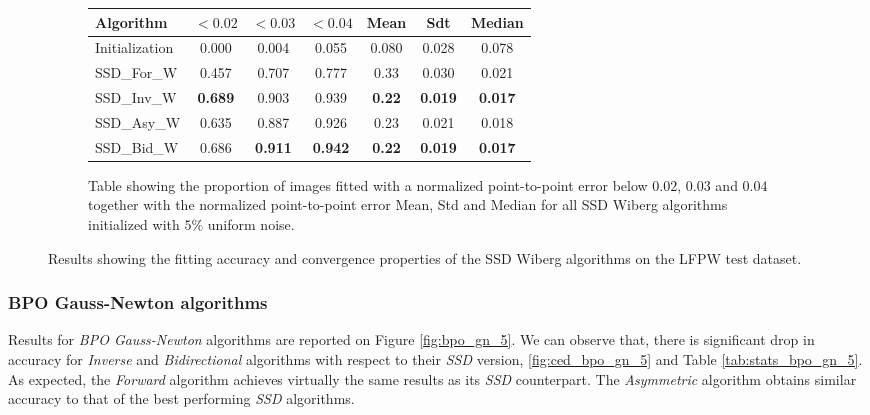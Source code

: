 \begin{figure}[p]
\begin{subfigure}{0.48\textwidth}
	    \label{fig:mean_cost_vs_iters2_ssd_w_5}
	\end{subfigure}
	\par\bigskip\bigskip
	\begin{subfigure}{\textwidth}
		\center
		\begin{tabular}{lcccccc}
		    \toprule
		    Algorithm & $<0.02$ & $<0.03$ & $<0.04$ & Mean & Sdt & Median 
		    \\
		    \midrule
		    Initialization & 0.000 & 0.004 & 0.055 & 0.080 & 0.028 & 0.078
		    \\ 
		    SSD\_For\_W & 0.457 & 0.707 & 0.777 & 0.33 & 0.030 & 0.021
		    \\
		    SSD\_Inv\_W & \textbf{0.689} & 0.903 & 0.939 & \textbf{0.22} & \textbf{0.019} & \textbf{0.017}
		    \\
		    SSD\_Asy\_W & 0.635 & 0.887 & 0.926 & 0.23 & 0.021 & 0.018
		    \\
		    SSD\_Bid\_W & 0.686 & \textbf{0.911} & \textbf{0.942} & \textbf{0.22} & \textbf{0.019} & \textbf{0.017}
		    \\
		    \bottomrule
	  	\end{tabular}
	  	\caption{Table showing the proportion of images fitted with a normalized point-to-point error below $0.02$, $0.03$ and $0.04$ together with the normalized point-to-point error Mean, Std and Median for all SSD Wiberg algorithms initialized with $5\%$ uniform noise.}
	    \label{tab:stats_ssd_w_5}
	\end{subfigure}
	\caption{Results showing the fitting accuracy and convergence properties of the SSD Wiberg algorithms on the LFPW test dataset.}
	\label{fig:ssd_w_5}
\end{figure}


\subsubsection{BPO Gauss-Newton algorithms}

Results for \emph{BPO Gauss-Newton} algorithms are reported on Figure \ref{fig:bpo_gn_5}. We can observe that, there is significant drop in accuracy for \emph{Inverse} and \emph{Bidirectional} algorithms with respect to their \emph{SSD} version, \ref{fig:ced_bpo_gn_5} and Table \ref{tab:stats_bpo_gn_5}. As expected, the \emph{Forward} algorithm achieves virtually the same results as its \emph{SSD} counterpart. The \emph{Asymmetric} algorithm obtains similar accuracy to that of the best performing \emph{SSD} algorithms.

